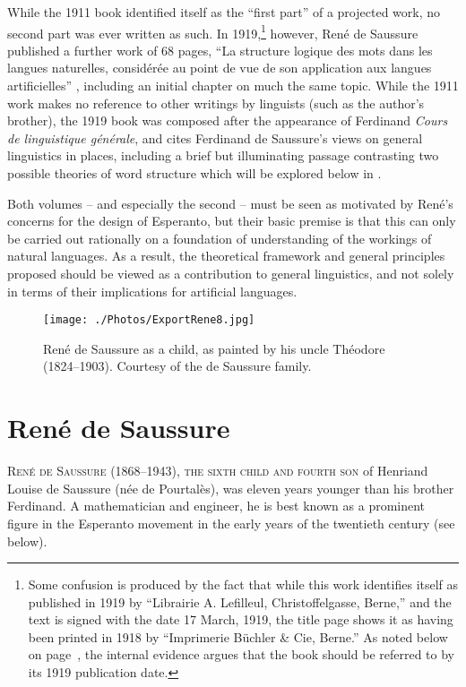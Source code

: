 \begin{refsection}
While the 1911 book identified itself as the ``first part'' of a
projected work, no second part was ever written as such. In
1919,\footnote{Some confusion is produced by the fact that while this
  work identifies itself as published in 1919 by ``Librairie
  A. Lefilleul, Christoffelgasse, Berne,'' and the text is signed with
  the date 17 March, 1919, the title page shows it as having been
  printed in 1918 by ``Imprimerie B\"uchler \& Cie, Berne.''  As noted
  below on page~\pageref{page:date.1919}, the internal evidence argues
  that the book should be referred to by its 1919 publication date.}
however, René de Saussure published a further work of 68 pages, ``La
structure logique des mots dans les langues naturelles,
consid\'er\'ee au point de vue de son application aux langues
artificielles'' \citep{r.desaussure19:structure.logique}, including an
initial chapter on much the same topic.  While the 1911 work makes no
reference to other writings by linguists (such as the author's
brother), the 1919 book was composed after the appearance of Ferdinand
 \emph{Cours de linguistique
  générale}, and cites Ferdinand de Saussure's views on general
linguistics in places, including a brief but illuminating passage
contrasting two possible theories of word structure
 which will be
explored below in .\largerpage[-2]\pagebreak

Both volumes -- and especially the second -- must be seen
as motivated by Ren\'e's concerns for the design of Esperanto, but their
basic premise is that this can only be carried out rationally on a
foundation of understanding of the workings of natural languages. As a
result, the theoretical framework and general principles proposed
should be viewed as a contribution to general linguistics, and not
solely in terms of their implications for artificial languages.

\begin{figure}[p]
  \begin{center}
    \texttt{[image: ./Photos/ExportRene8.jpg]}
  \end{center}
  \caption{\label{fig:rene8}
  René de Saussure as a child, as painted by his uncle
    Théodore (1824--1903). Courtesy of the de Saussure family.}
\end{figure}

\section*{René de Saussure}
\label{sec:bio}
\noindent
\lettrine[loversize=0.1, nindent=0.5em]{R}{en\'e de Saussure
  (1868--1943), the sixth child and fourth son} of Henri\linebreak and Louise de
Saussure (née de Pourtalès), was eleven years younger than his brother
Ferdinand. A mathematician and engineer, he is best known as a
prominent figure in the Esperanto movement in the early years of the
twentieth century (see  below).


\end{refsection}
